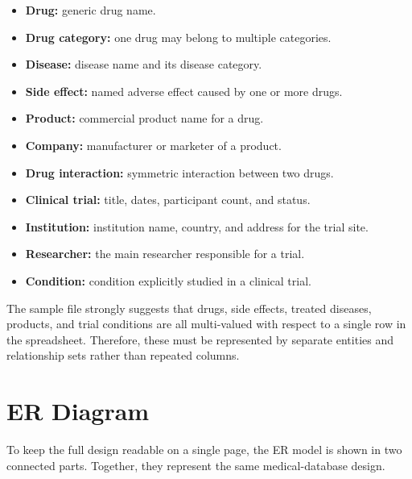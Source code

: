 \documentclass[12pt,a4paper]{article}
\begin{document}
\begin{itemize}[leftmargin=1.5em]
    \item \textbf{Drug:} generic drug name.
    \item \textbf{Drug category:} one drug may belong to multiple categories.
    \item \textbf{Disease:} disease name and its disease category.
    \item \textbf{Side effect:} named adverse effect caused by one or more drugs.
    \item \textbf{Product:} commercial product name for a drug.
    \item \textbf{Company:} manufacturer or marketer of a product.
    \item \textbf{Drug interaction:} symmetric interaction between two drugs.
    \item \textbf{Clinical trial:} title, dates, participant count, and status.
    \item \textbf{Institution:} institution name, country, and address for the trial site.
    \item \textbf{Researcher:} the main researcher responsible for a trial.
    \item \textbf{Condition:} condition explicitly studied in a clinical trial.
\end{itemize}

The sample file strongly suggests that drugs, side effects, treated diseases, products, and trial
conditions are all multi-valued with respect to a single row in the spreadsheet. Therefore, these
must be represented by separate entities and relationship sets rather than repeated columns.

\section{ER Diagram}
To keep the full design readable on a single page, the ER model is shown in two connected parts.
Together, they represent the same medical-database design.
\end{document}
